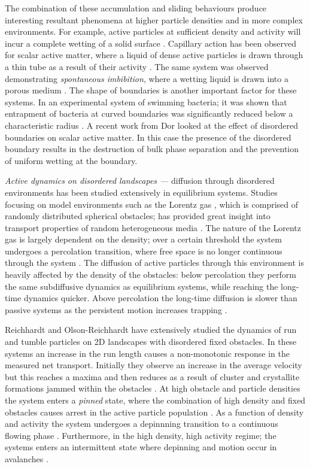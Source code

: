 The combination of these accumulation and sliding behaviours produce interesting resultant phenomena at higher particle densities and in more complex environments. For example, active particles at sufficient density and activity will incur a complete wetting of a solid surface \cite{neta2021}. Capillary action has been observed for scalar active matter, where a liquid of dense active particles is drawn through a thin tube as a result of their activity \cite{wysocki2020}. The same system was observed demonstrating \textit{spontaneous imbibition}, where a wetting liquid is drawn into a porous medium \cite{wysocki2020}. The shape of boundaries is another important factor for these systems. In an experimental system of swimming bacteria; it was shown that entrapment of bacteria at curved boundaries was significantly reduced below a characteristic radius \cite{sipos2015}.
A recent work from Dor \etal \cite{dor2021} looked at the effect of disordered boundaries on scalar active matter. In this case the presence of the disordered boundary results in the destruction of bulk phase separation and the prevention of uniform wetting at the boundary.

\textit{Active dynamics on disordered landscapes ---} diffusion through disordered environments has been studied extensively in equilibrium systems. Studies focusing on model environments such as the Lorentz gas \cite{vanbeijeren1982}, which is comprised of randomly distributed spherical obstacles; has provided great insight into transport properties of random heterogeneous media \cite{dettmann2014}. The nature of the Lorentz gas is largely dependent on the density; over a certain threshold the system undergoes a percolation transition, where free space is no longer continuous through the system \cite{spanner2011}. The diffusion of active particles through this environment is heavily affected by the density of the obstacles: below percolation they perform the same subdiffusive dynamics as equilibrium systems, while reaching the long-time dynamics quicker. Above percolation the long-time diffusion is slower than passive systems as the persistent motion increases trapping \cite{zeitz2017}. 

Reichhardt and Olson-Reichhardt \cite{reichhardt2014,reichhardt2017,reichhardt2018a,reichhardt2018b} have extensively studied the dynamics of run and tumble particles on 2D landscapes with disordered fixed obstacles. In these systems an increase in the run length causes a non-monotonic response in the measured net transport. Initially they observe an increase in the average velocity but this reaches a maxima and then reduces as a result of cluster and crystallite formations jammed within the obstacles \cite{reichhardt2014}. At high obstacle and particle densities the system enters a \textit{pinned} state, where the combination of high density and fixed obstacles causes arrest in the active particle population \cite{reichhardt2018a}. As a function of density and activity the system undergoes a depinnning transition to a continuous flowing phase \cite{reichhardt2018b}. Furthermore, in the high density, high activity regime; the systems enters an intermittent state where depinning and motion occur in avalanches \cite{reichhardt2018b}.  
  

